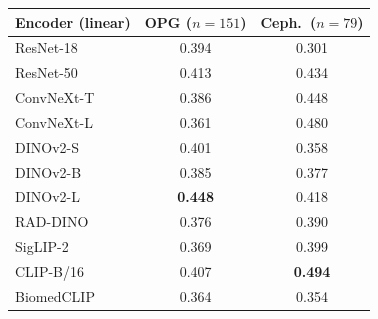 \begin{tabular}{@{}lcc@{}}\toprule
Encoder (linear) & OPG ($n=151$) & Ceph.\ ($n=79$)\\\midrule
ResNet-18 & 0.394 & 0.301\\
ResNet-50 & 0.413 & 0.434\\
ConvNeXt-T & 0.386 & 0.448\\
ConvNeXt-L & 0.361 & 0.480\\
DINOv2-S & 0.401 & 0.358\\
DINOv2-B & 0.385 & 0.377\\
DINOv2-L & \textbf{0.448} & 0.418\\
RAD-DINO & 0.376 & 0.390\\
SigLIP-2 & 0.369 & 0.399\\
CLIP-B/16 & 0.407 & \textbf{0.494}\\
BiomedCLIP & 0.364 & 0.354\\
\bottomrule\end{tabular}
